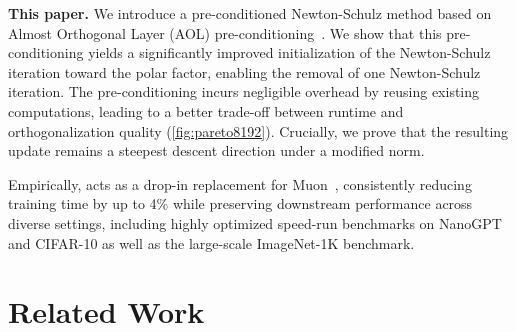 \textbf{This paper.} 
We introduce a pre-conditioned Newton-Schulz method based on Almost Orthogonal Layer (AOL) pre-conditioning~\cite{prach2022almost}. We show that this pre-conditioning yields a significantly improved initialization of the Newton-Schulz iteration toward the polar factor, enabling the removal of one Newton-Schulz iteration. The pre-conditioning incurs negligible overhead by reusing existing computations, leading to a better trade-off between runtime and orthogonalization quality (\cref{fig:pareto8192}).
Crucially, we prove that the resulting update remains a steepest descent direction under a modified norm. 


Empirically, \turbomuon acts as a drop-in replacement for Muon~\cite{jordan2024muon}, consistently reducing training time by up to 4\% while preserving downstream performance across diverse settings, including highly optimized speed-run benchmarks on NanoGPT and CIFAR-10 as well as the large-scale ImageNet-1K benchmark.

\section{Related Work}
\label{sec:related}


